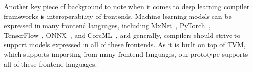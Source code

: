 





Another key piece of background to note
  when it comes to deep learning compiler frameworks
  is interoperability of frontends.
Machine learning models can be expressed
  in many frontend languages,
  including MxNet~\cite{chen2015mxnet},
  PyTorch~\cite{paszke2019pytorch},
  TensorFlow~\cite{abadi2016tensorflow},
  ONNX~\cite{linux2019onnx},
  and CoreML~\cite{apple2022coreml},
  and generally,
  compilers should strive to support
  models expressed in all of these frontends.
As it is built on top of TVM,
  which supports importing from many
  frontend languages,
  our \TLA prototype
  supports all of these frontend languages.
  
